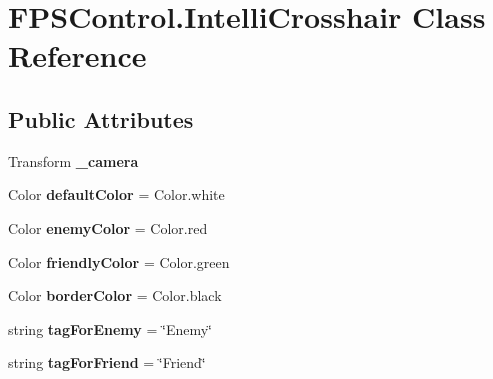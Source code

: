 \hypertarget{class_f_p_s_control_1_1_intelli_crosshair}{\section{F\-P\-S\-Control.\-Intelli\-Crosshair Class Reference}
\label{class_f_p_s_control_1_1_intelli_crosshair}
}
\subsection*{Public Attributes}
\begin{DoxyCompactItemize}
\item 
\hypertarget{class_f_p_s_control_1_1_intelli_crosshair_ab0f9215e7c42085d6c5d00d63d33d14c}{Transform {\bfseries \-\_\-camera}}\label{class_f_p_s_control_1_1_intelli_crosshair_ab0f9215e7c42085d6c5d00d63d33d14c}

\item 
\hypertarget{class_f_p_s_control_1_1_intelli_crosshair_ab05ef813e8e04aa2f481eba8e6986571}{Color {\bfseries default\-Color} = Color.\-white}\label{class_f_p_s_control_1_1_intelli_crosshair_ab05ef813e8e04aa2f481eba8e6986571}

\item 
\hypertarget{class_f_p_s_control_1_1_intelli_crosshair_a879858daee56fa86b8d5cfe97cd435bc}{Color {\bfseries enemy\-Color} = Color.\-red}\label{class_f_p_s_control_1_1_intelli_crosshair_a879858daee56fa86b8d5cfe97cd435bc}

\item 
\hypertarget{class_f_p_s_control_1_1_intelli_crosshair_a2e99e50e20c0cee12365df7928ac1f42}{Color {\bfseries friendly\-Color} = Color.\-green}\label{class_f_p_s_control_1_1_intelli_crosshair_a2e99e50e20c0cee12365df7928ac1f42}

\item 
\hypertarget{class_f_p_s_control_1_1_intelli_crosshair_a686de5ddb6ff47a2f56a5fe18c4c8567}{Color {\bfseries border\-Color} = Color.\-black}\label{class_f_p_s_control_1_1_intelli_crosshair_a686de5ddb6ff47a2f56a5fe18c4c8567}

\item 
\hypertarget{class_f_p_s_control_1_1_intelli_crosshair_a55f0b04bfab55aac0785a0a09485a10a}{string {\bfseries tag\-For\-Enemy} = \char`\"{}Enemy\char`\"{}}\label{class_f_p_s_control_1_1_intelli_crosshair_a55f0b04bfab55aac0785a0a09485a10a}

\item 
\hypertarget{class_f_p_s_control_1_1_intelli_crosshair_ad92452369f20ee7b63672f939ef7a2fb}{string {\bfseries tag\-For\-Friend} = \char`\"{}Friend\char`\"{}}\label{class_f_p_s_control_1_1_intelli_crosshair_ad92452369f20ee7b63672f939ef7a2fb}


\end{DoxyCompactItemize}

